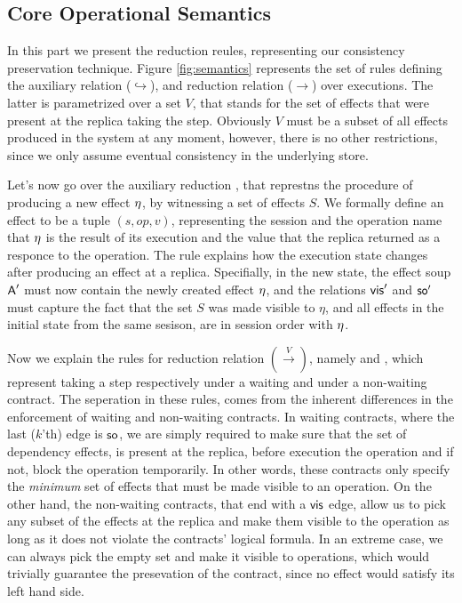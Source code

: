 \subsection{Core Operational Semantics}



In this part we present the reduction reules, representing our
consistency preservation technique.
Figure \ref{fig:semantics} represents the set of rules defining the
auxiliary relation ($\hookrightarrow$), and reduction relation 
($\rightarrow$) over executions. The latter is parametrized over a set $V$,
that stands for the set of effects that were present at the replica
taking the step. Obviously $V$ must be a subset of all effects produced
in the system at any moment, however, there is no other restrictions,
since we only assume eventual consistency in the underlying store.

Let's now go over the auxiliary reduction 
,
that represtns the procedure of producing a new effect $\eta$, by witnessing a set
of effects $S$. 
We formally define an effect to be a tuple $(s,op,v)$, representing the
session and the operation name that $\eta$ is the result of its execution and the value
that the replica returned as a responce to the operation.
The rule explains how the execution state changes after producing an
effect at a replica. Specifially, in the new state, the effect soup
${\normalfont \textsf{A}}'$ must
now contain the newly created effect $\eta$, and the relations ${\normalfont \textsf{vis}}'$
and ${\normalfont \textsf{so}}'$ must capture the fact that the set $S$ was made
visible to $\eta$, and all effects in the initial state from the same
sesison, are in session order with $\eta$.


Now we explain the rules for reduction relation $(\xrightarrow{V})$,
namely   and
, which represent taking a step respectively
under a waiting and under a non-waiting contract. The seperation in
these rules, comes from the inherent differences in the enforcement of
waiting and non-waiting contracts. In waiting contracts, where the last
($k$'th) edge is ${\normalfont \textsf{so}}$, we are simply required to make sure that the
set of dependency effects, is
present at the replica, before execution the operation and if not, block
the operation temporarily. In other words, these contracts only specify
the \emph{minimum} set of effects that must be made visible to an
operation. On the other hand, the non-waiting contracts, that end with a
${\normalfont \textsf{vis}}$ edge, allow us to pick any subset of the  effects at the
replica and make them visible to the operation as long as it does not
violate the contracts' logical formula. In an extreme case, we can
always pick the empty set and make it visible to operations, which
would trivially guarantee the presevation of the contract, since no effect
would satisfy its left hand side. 

